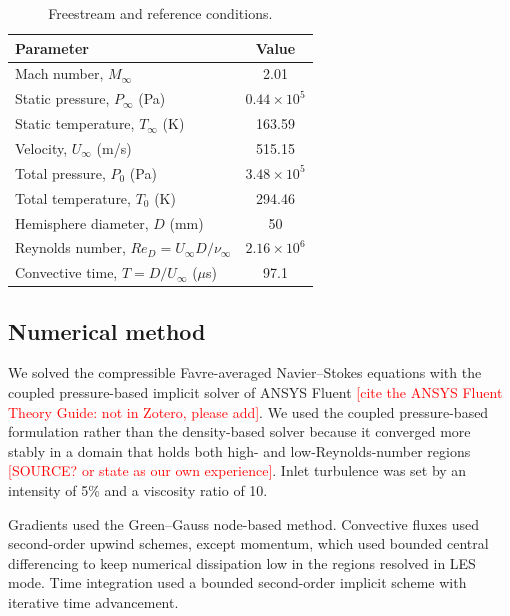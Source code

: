 \documentclass[11pt,a4paper]{article}
\newcommand{\chk}[1]{\textcolor{red}{[#1]}}
\begin{document}
\begin{table}[htbp]
  \centering
  \caption{Freestream and reference conditions.}
  \label{tab:flow}
  \begin{tabular}{lc}
    \toprule
    Parameter & Value \\
    \midrule
    Mach number, $M_\infty$ & 2.01 \\
    Static pressure, $P_\infty$ (Pa) & $0.44\times10^5$ \\
    Static temperature, $T_\infty$ (K) & 163.59 \\
    Velocity, $U_\infty$ (m/s) & 515.15 \\
    Total pressure, $P_0$ (Pa) & $3.48\times10^5$ \\
    Total temperature, $T_0$ (K) & 294.46 \\
    Hemisphere diameter, $D$ (mm) & 50 \\
    Reynolds number, $Re_D = U_\infty D/\nu_\infty$ & $2.16\times10^6$ \\
    Convective time, $T = D/U_\infty$ ($\mu$s) & 97.1 \\
    \bottomrule
  \end{tabular}
\end{table}

\subsection{Numerical method}

We solved the compressible Favre-averaged Navier--Stokes equations with the coupled pressure-based implicit solver of ANSYS Fluent \chk{cite the ANSYS Fluent Theory Guide: not in Zotero, please add}. We used the coupled pressure-based formulation rather than the density-based solver because it converged more stably in a domain that holds both high- and low-Reynolds-number regions \chk{SOURCE? or state as our own experience}. Inlet turbulence was set by an intensity of 5\% and a viscosity ratio of 10.

Gradients used the Green--Gauss node-based method. Convective fluxes used second-order upwind schemes, except momentum, which used bounded central differencing to keep numerical dissipation low in the regions resolved in LES mode. Time integration used a bounded second-order implicit scheme with iterative time advancement.
\end{document}

